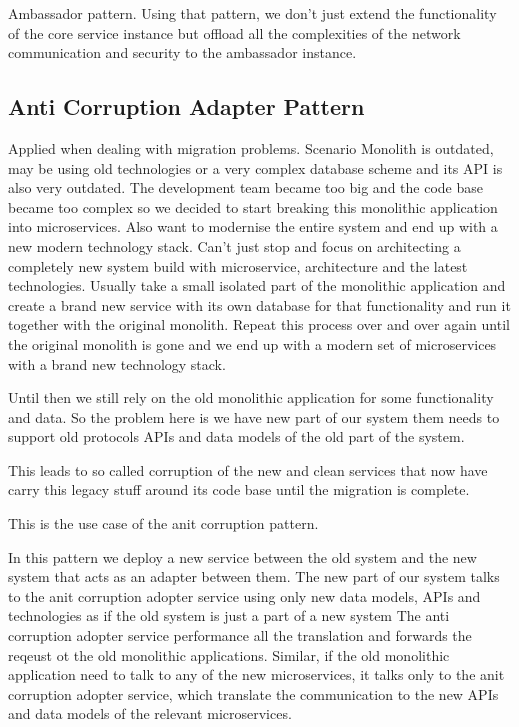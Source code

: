 Ambassador pattern.
Using that pattern, we don't just extend the functionality of the core service instance but offload all the complexities of the network communication and security to the ambassador instance.

\subsection{Anti Corruption Adapter Pattern}
Applied when dealing with migration problems.
Scenario
Monolith is outdated, may be using old technologies or a very complex database scheme and its API is also very outdated.
The development team became too big and the code base became too complex so we decided to start breaking this monolithic application into microservices.
Also want to modernise the entire system and end up with a new modern technology stack.
Can't just stop and focus on architecting a completely new system build with microservice, architecture and the latest technologies.
Usually take a small isolated part of the monolithic application and create a brand new service with its own database for that functionality and run it together with the original monolith.
Repeat this process over and over again until the original monolith is gone and we end up with a modern set of microservices with a brand new technology stack.

Until then we still rely on the old monolithic application for some functionality and data.
So the problem here is we have new part of our system them needs to support old protocols APIs and data models of the old part of the system.

This leads to so called corruption of the new and clean services that now have carry this legacy stuff around its code base until the migration is complete.

This is the use case of the anit corruption pattern.

In this pattern we deploy a new service between the old system and the new system that acts as an adapter between them.
The new part of our system talks to the anit corruption adopter service using only new data models, APIs and technologies as if the old system is just a part of a new system
The anti corruption adopter service performance all the translation and forwards the reqeust ot the old monolithic applications.
Similar, if the old monolithic application need to talk to any of the new microservices, it talks only to the anit corruption adopter service, which translate the communication to the new APIs and data models of the relevant microservices.

